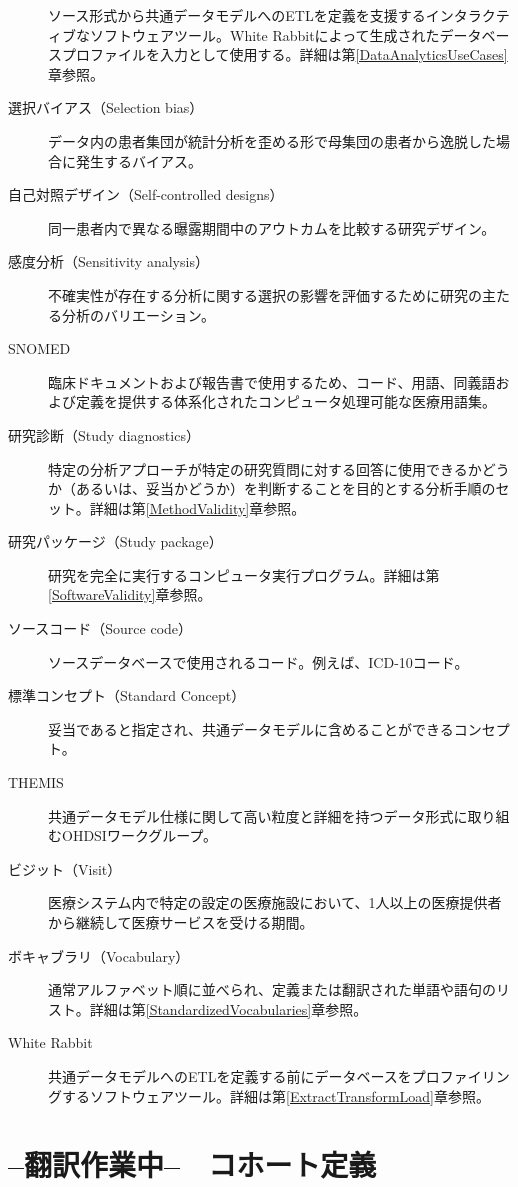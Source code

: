 \documentclass[
  11pt]{book}
\theoremstyle{definition}
\theoremstyle{definition}
\theoremstyle{definition}
\theoremstyle{definition}
\theoremstyle{remark}
\begin{document}
\begin{description}
ソース形式から共通データモデルへのETLを定義を支援するインタラクティブなソフトウェアツール。White Rabbitによって生成されたデータベースプロファイルを入力として使用する。詳細は第\ref{DataAnalyticsUseCases}章参照。
\item[選択バイアス（Selection bias）]
データ内の患者集団が統計分析を歪める形で母集団の患者から逸脱した場合に発生するバイアス。
\item[自己対照デザイン（Self-controlled designs）]
同一患者内で異なる曝露期間中のアウトカムを比較する研究デザイン。
\item[感度分析（Sensitivity analysis）]
不確実性が存在する分析に関する選択の影響を評価するために研究の主たる分析のバリエーション。
\item[SNOMED]
臨床ドキュメントおよび報告書で使用するため、コード、用語、同義語および定義を提供する体系化されたコンピュータ処理可能な医療用語集。
\item[研究診断（Study diagnostics）]
特定の分析アプローチが特定の研究質問に対する回答に使用できるかどうか（あるいは、妥当かどうか）を判断することを目的とする分析手順のセット。詳細は第\ref{MethodValidity}章参照。
\item[研究パッケージ（Study package）]
研究を完全に実行するコンピュータ実行プログラム。詳細は第\ref{SoftwareValidity}章参照。
\item[ソースコード（Source code）]
ソースデータベースで使用されるコード。例えば、ICD-10コード。
\item[標準コンセプト（Standard Concept）]
妥当であると指定され、共通データモデルに含めることができるコンセプト。
\item[THEMIS]
共通データモデル仕様に関して高い粒度と詳細を持つデータ形式に取り組むOHDSIワークグループ。
\item[ビジット（Visit）]
医療システム内で特定の設定の医療施設において、1人以上の医療提供者から継続して医療サービスを受ける期間。
\item[ボキャブラリ（Vocabulary）]
通常アルファベット順に並べられ、定義または翻訳された単語や語句のリスト。詳細は第\ref{StandardizedVocabularies}章参照。
\item[White Rabbit]
共通データモデルへのETLを定義する前にデータベースをプロファイリングするソフトウェアツール。詳細は第\ref{ExtractTransformLoad}章参照。
\end{description}

\chapter{--翻訳作業中--　コホート定義}\label{CohortDefinitions}
\end{document}
